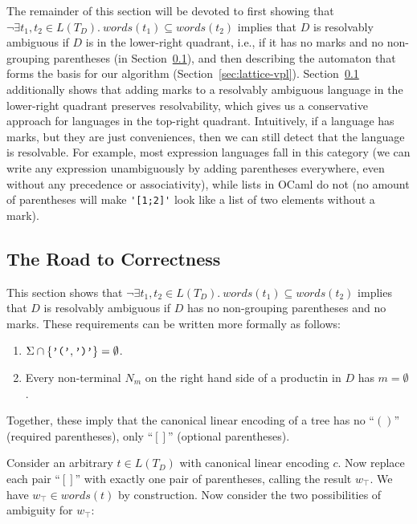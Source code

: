 \documentclass[runningheads]{llncs}
\newcommand{\T}{\Sigma} %
\newcommand{\words}{\mathit{words}} %
\newcommand{\reqpl}{(}
\newcommand{\reqpr}{)}
\newcommand{\reqp}[1]{\reqpl#1\reqpr}
\newcommand{\pospl}{[}
\newcommand{\pospr}{]}
\newcommand{\posp}[1]{\pospl#1\pospr}
\begin{document}
The remainder of this section will be devoted to first showing that $\neg \exists t_1, t_2 \in L(T_D).\ \words(t_1) \subseteq \words(t_2)$ implies that $D$ is resolvably ambiguous if $D$ is in the lower-right quadrant, i.e., if it has no marks and no non-grouping parentheses (in Section~\ref{sec:static-proofs}), and then describing the automaton that forms the basis for our algorithm (Section~\ref{sec:lattice-vpl}). Section~\ref{sec:static-proofs} additionally shows that adding marks to a resolvably ambiguous language in the lower-right quadrant preserves resolvability, which gives us a conservative approach for languages in the top-right quadrant. Intuitively, if a language has marks, but they are just conveniences, then we can still detect that the language is resolvable. For example, most expression languages fall in this category (we can write any expression unambiguously by adding parentheses everywhere, even without any precedence or associativity), while lists in OCaml do not (no amount of parentheses will make \verb|'[1;2]'| look like a list of two elements without a mark).

\subsection{The Road to Correctness} \label{sec:static-proofs} %

This section shows that $\neg \exists t_1, t_2 \in L(T_D).\ \words(t_1) \subseteq \words(t_2)$ implies that $D$ is resolvably ambiguous if $D$ has no non-grouping parentheses and no marks. These requirements can be written more formally as follows:

\begin{enumerate}
  \item $\T \cap \{\verb|'('|, \verb|')'|\} = \emptyset$.
  \item Every non-terminal $N_m$ on the right hand side of a productin in $D$ has $m = \emptyset$.
\end{enumerate}

\noindent Together, these imply that the canonical linear encoding of a tree has no ``$\reqp{}$'' (required parentheses), only ``$\posp{}$'' (optional parentheses).

Consider an arbitrary $t \in L(T_D)$ with canonical linear encoding $c$. Now replace each pair ``$\posp{}$'' with exactly one pair of parentheses, calling the result $w_\top$. We have $w_\top \in \words(t)$ by construction. Now consider the two possibilities of ambiguity for $w_\top$:
\end{document}
